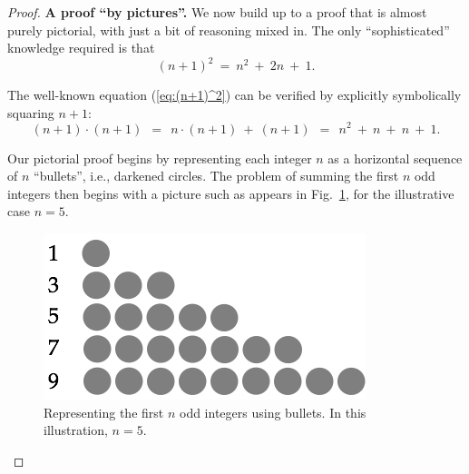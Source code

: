 \begin{proof}
{\bf A proof ``by pictures''.}
%
We now build up to a proof that is almost purely pictorial, with just
a bit of reasoning mixed in.  The only ``sophisticated'' knowledge
required is that
\begin{equation}
\label{eq:(n+1)^2}
(n+1)^2 \ = \ n^2 \ + \ 2n \ + \ 1.
\end{equation}
\medskip

\noindent {}
\medskip

The well-known equation (\ref{eq:(n+1)^2}) can be verified by
explicitly symbolically squaring $n+1$:
\[ (n+1) \cdot (n+1) \ \ = \ \ n \cdot (n+1) \ + \ (n+1) 
     \ \ = \ \ n^2 \ + \ n \ + \ n \ + \ 1.
\]


\noindent
%
Our pictorial proof begins by representing each integer $n$ as a
horizontal sequence of $n$ ``bullets'', i.e., darkened circles.  The
problem of summing the first $n$ odd integers then begins with a
picture such as appears in Fig.~\ref{fig:sumOdds1}, for the
illustrative case $n=5$.

\begin{figure}[ht]
\begin{center}
       \includegraphics[scale=0.4]{FiguresMaths/SumOddsBasis}
\caption{Representing the first $n$ odd integers using bullets.  In
  this illustration, $n=5$.}
       \label{fig:sumOdds1}
\end{center}
\end{figure}


\end{proof}
